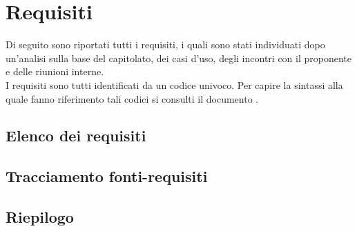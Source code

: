 \section{Requisiti}

Di seguito sono riportati tutti i requisiti, i quali sono stati individuati dopo un'analisi sulla base del capitolato, dei casi d'uso, degli incontri con il proponente e delle riunioni interne.\\
I requisiti sono tutti identificati da un codice univoco. Per capire la sintassi alla quale fanno riferimento tali codici si consulti il documento .

%

\subsection{Elenco dei requisiti}


%

\subsection{Tracciamento fonti-requisiti}


\subsection{Riepilogo}
